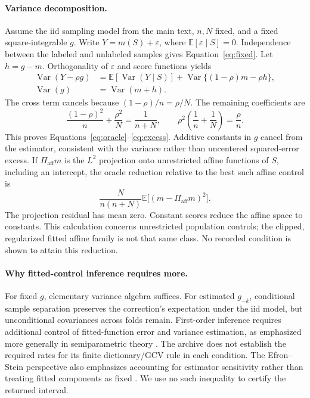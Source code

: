 \documentclass{article}
\newcommand{\E}{\mathbb{E}}
\newcommand{\Var}{\operatorname{Var}}
\begin{document}
\paragraph{Variance decomposition.}
Assume the iid sampling model from the main text, $n,N$ fixed, and a fixed square-integrable $g$. Write $Y=m(S)+\varepsilon$, where $\E[\varepsilon\mid S]=0$. Independence between the labeled and unlabeled samples gives Equation~\ref{eq:fixed}. Let $h=g-m$. Orthogonality of $\varepsilon$ and score functions yields
\begin{align}
\Var(Y-\rho g)&=\E[\Var(Y\mid S)]+\Var\{(1-\rho)m-\rho h\},\\
\Var(g)&=\Var(m+h).
\end{align}
The cross term cancels because $(1-\rho)/n=\rho/N$. The remaining coefficients are
\begin{equation}
\frac{(1-\rho)^2}{n}+\frac{\rho^2}{N}=\frac{1}{n+N},\qquad
\rho^2\left(\frac1n+\frac1N\right)=\frac{\rho}{n}.
\end{equation}
This proves Equations~\ref{eq:oracle}--\ref{eq:excess}. Additive constants in $g$ cancel from the estimator, consistent with the variance rather than uncentered squared-error excess. If $\Pi_{\mathrm{aff}}m$ is the $L^2$ projection onto unrestricted affine functions of $S$, including an intercept, the oracle reduction relative to the best such affine control is
\begin{equation}
\frac{N}{n(n+N)}\E\bigl[(m-\Pi_{\mathrm{aff}}m)^2\bigr].
\end{equation}
The projection residual has mean zero. Constant scores reduce the affine space to constants. This calculation concerns unrestricted population controls; the clipped, regularized fitted affine family is not that same class. No recorded condition is shown to attain this reduction.

\paragraph{Why fitted-control inference requires more.}
For fixed $g$, elementary variance algebra suffices. For estimated $g_{-k}$, conditional sample separation preserves the correction's expectation under the iid model, but unconditional covariances across folds remain. First-order inference requires additional control of fitted-function error and variance estimation, as emphasized more generally in semiparametric theory \citep{Robinson1988,VanDerVaart1998,Chernozhukov2018DML}. The archive does not establish the required rates for its finite dictionary/GCV rule in each condition. The Efron--Stein perspective also emphasizes accounting for estimator sensitivity rather than treating fitted components as fixed \citep{EfronStein1981}. We use no such inequality to certify the returned interval.
\end{document}
